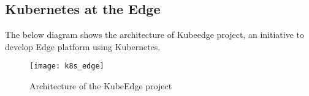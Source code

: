 \subsection{Kubernetes at the Edge}

\begin{flushleft}
The below diagram shows the architecture of Kubeedge project, an initiative to develop Edge platform using Kubernetes.
\end{flushleft}

\begin{figure}
    \centering
    \texttt{[image: k8s\_edge]}
    \label{fig:figure14}
    \caption{Architecture of the KubeEdge project}
\end{figure}

